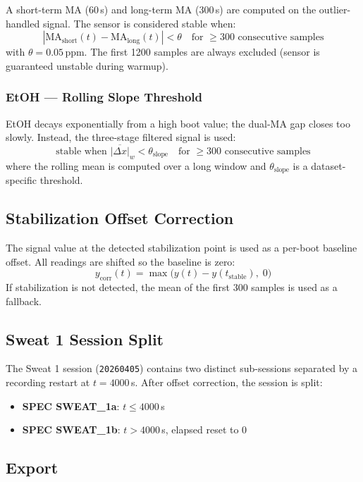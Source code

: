 \documentclass[11pt,a4paper]{article}
\begin{document}
A short-term MA (60\,s) and long-term MA (300\,s) are computed on the
outlier-handled signal.  The sensor is considered stable when:
\[
  |\text{MA}_{\text{short}}(t) - \text{MA}_{\text{long}}(t)| < \theta
  \quad \text{for } \geq 300 \text{ consecutive samples}
\]
with $\theta = 0.05$\,ppm.  The first 1200 samples are always excluded (sensor
is guaranteed unstable during warmup).

\subsubsection*{EtOH --- Rolling Slope Threshold}

EtOH decays exponentially from a high boot value; the dual-MA gap closes too
slowly.  Instead, the three-stage filtered signal is used:
\[
  \text{stable when } \overline{|\Delta x|}_{w} < \theta_{\text{slope}}
  \quad \text{for } \geq 300 \text{ consecutive samples}
\]
where the rolling mean is computed over a long window and
$\theta_{\text{slope}}$ is a dataset-specific threshold.

\subsection{Stabilization Offset Correction}

The signal value at the detected stabilization point is used as a per-boot
baseline offset.  All readings are shifted so the baseline is zero:
\[
  y_{\text{corr}}(t) = \max\!\bigl(y(t) - y(t_{\text{stable}}),\; 0\bigr)
\]
If stabilization is not detected, the mean of the first 300 samples is used
as a fallback.

\subsection{Sweat 1 Session Split}

The Sweat 1 session (\texttt{20260405}) contains two distinct sub-sessions
separated by a recording restart at $t = 4000$\,s.  After offset correction,
the session is split:

\begin{itemize}
  \item \textbf{SPEC SWEAT\_1a}: $t \leq 4000$\,s
  \item \textbf{SPEC SWEAT\_1b}: $t > 4000$\,s, elapsed reset to 0
\end{itemize}

\subsection{Export}
\end{document}
